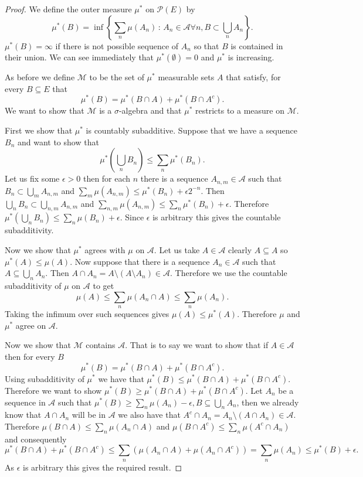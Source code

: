 \documentclass[11pt]{article}
\theoremstyle{definition}
\theoremstyle{remark}
\begin{document}
\begin{proof}
We define the outer measure $\mu^*$ on $\mathscr{P}(E)$ by
\[ \mu^*(B) = \inf \left\{ \sum_n \mu(A_n) \,:\, A_n \in \mathcal{A} \forall n, B \subset \bigcup_n A_n \right\}. \] $\mu^*(B) = \infty$ if there is not possible sequence of $A_n$ so that $B$ is contained in their union. We can see immediately that $\mu^*(\emptyset) =0$ and $\mu^*$ is increasing. 

As before we define $\mathscr{M}$ to be the set of $\mu^*$ measurable sets $A$ that satisfy, for every $B \subseteq E$ that
\[ \mu^*(B) = \mu^*(B \cap A) + \mu^*(B \cap A^c).  \] We want to show that $\mathscr{M}$ is a $\sigma$-algebra and that $\mu^*$ restricts to a measure on $\mathscr{M}$.

First we show that $\mu^*$ is countably subadditive. Suppose that we have a sequence $B_n$ and want to show that
\[ \mu^*\left( \bigcup_n B_n\right) \leq \sum_n \mu^*(B_n). \] Let us fix some $\epsilon >0$ then for each $n$ there is a sequence $A_{n,m} \in \mathcal{A}$ such that $B_n \subset \bigcup_m A_{n,m}$ and $\sum_m \mu(A_{n,m}) \leq \mu^*(B_n) + \epsilon 2^{-n}$. Then $\bigcup_n B_n \subset \bigcup_{n,m} A_{n,m}$ and $\sum_{n,m}\mu(A_{n,m}) \leq \sum_n \mu^*(B_n) + \epsilon$. Therefore $\mu^* \left( \bigcup_n B_n \right) \leq \sum_n \mu(B_n) + \epsilon$. Since $\epsilon$ is arbitrary this gives the countable subadditivity. 

Now we show that $\mu^*$ agrees with $\mu$ on $\mathcal{A}$. Let us take $A \in \mathcal{A}$ clearly $A \subseteq A$ so $\mu^*(A) \leq \mu(A)$. Now suppose that there is a sequence $A_n \in \mathcal{A}$ such that $A \subseteq \bigcup_n A_n$. Then $A \cap A_n = A \setminus (A \setminus A_n) \in \mathcal{A}$. Therefore we use the countable subadditivity of $\mu$ on $\mathcal{A}$ to get
\[ \mu (A) \leq  \sum_n \mu(A_n \cap A) \leq \sum_n \mu(A_n).\] Taking the infimum over such sequences gives $\mu(A) \leq \mu^*(A)$. Therefore $\mu$ and $\mu^*$ agree on $\mathcal{A}$. 

Now we show that $\mathscr{M}$ contains $\mathcal{A}$. That is to say we want to show that if $A \in \mathcal{A}$ then for every $B$
\[ \mu^*(B) = \mu^*(B \cap A) + \mu^*(B \cap A^c). \] Using subadditivity of $\mu^*$ we have that $\mu^*(B) \leq \mu^*(B \cap A) + \mu^*(B \cap A^c)$. Therefore we want to show $\mu^*(B) \geq \mu^*(B \cap A) + \mu^*(B \cap A^c)$. Let $A_n$ be a sequence in $\mathcal{A}$ such that $\mu^*(B) \geq \sum_n \mu(A_n) - \epsilon, B \subseteq \bigcup_n A_n$, then we already know that $A \cap A_n$ will be in $\mathcal{A}$ we also have that $A^c \cap A_n = A_n \setminus (A \cap A_n) \in \mathcal{A}$. Therefore $\mu(B \cap A) \leq \sum_n \mu(A_n \cap A)$ and $\mu(B \cap A^c) \leq \sum_n \mu(A^c \cap A_n)$ and consequently
\[ \mu^*(B \cap A) + \mu^*(B \cap A^c) \leq \sum_n \left( \mu(A_n \cap A) + \mu(A_n \cap A^c) \right) = \sum_n \mu(A_n) \leq \mu^*(B) + \epsilon. \] As $\epsilon$ is arbitrary this gives the required result. 


\end{proof}
\end{document}
